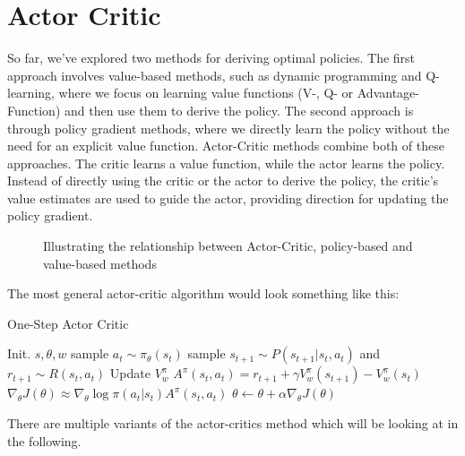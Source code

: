 \section{Actor Critic}
So far, we’ve explored two methods for deriving optimal policies. The first approach involves 
value-based methods, such as dynamic programming and Q-learning, where we focus on learning 
value functions (V-, Q- or Advantage-Function) and then use them to derive the policy.
The second approach is through policy gradient methods, where we directly learn the policy 
without the need for an explicit value function. Actor-Critic methods combine both of these approaches.
The critic learns a value function, while the actor learns the policy. Instead of directly using the 
critic or the actor to derive the policy, the critic's value estimates are used to guide the actor, providing 
direction for updating the policy gradient.
\begin{figure}[H]
    \centering
{}
    \caption{Illustrating the relationship between  Actor-Critic, policy-based and value-based methods}
    \label{fig:actor_critics_venn}
\end{figure}
The most general actor-critic algorithm would look something like this:
\begin{algorithm}[H]
  \large
    \caption{One-Step Actor Critic}\label{general_actor_critic}
    \begin{algorithmic}
        \STATE Init. $s,\theta,w$
        \STATE sample $a_t \sim \pi_{\theta}(s_t)$
        \STATE sample $s_{t+1} \sim P(s_{t+1}|s_t,a_t)$ and  $r_{t+1} \sim R(s_t,a_t)$
        \STATE Update $V^\pi_w$
        \STATE $A^\pi(s_t,a_t) = r_{t+1} + \gamma V^\pi_{w}(s_{t+1})- V^\pi_{w}(s_t)$
        \STATE $\nabla_\theta J(\theta) \approx \nabla_\theta \log{\pi(a_t|s_t)A^\pi(s_t,a_t)}$
        \STATE $\theta \gets \theta + \alpha \nabla_\theta J(\theta) $
        \ENDFOR
    \end{algorithmic}
\end{algorithm}
There are multiple variants of the actor-critics method which will be looking at in the following.
